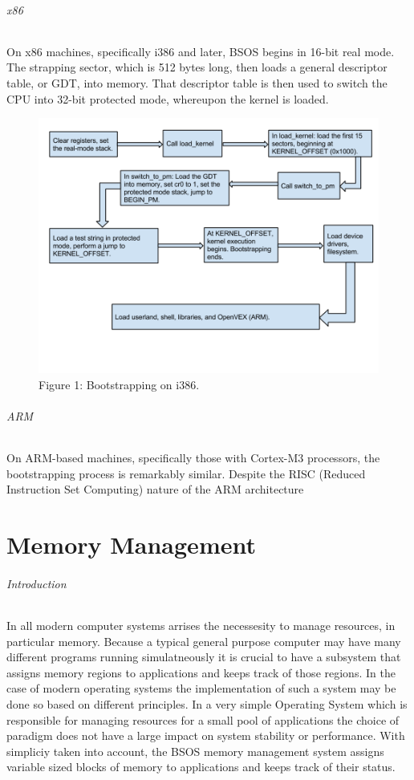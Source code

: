\documentclass[english]{article}
\begin{document}
\paragraph{x86}
On x86 machines, specifically i386 and later, BSOS begins in 16-bit real mode. The strapping sector, which is 512 bytes long, then loads a general descriptor table, or GDT, into memory. That descriptor table is then used to switch the CPU into 32-bit protected mode, whereupon the kernel is loaded.
\begin{figure}[h!]
\centerline{\includegraphics[scale=0.4]{imgs/boot_x86.png}}
\caption{Figure 1: Bootstrapping on i386.}
\end{figure}

\paragraph{ARM}
On ARM-based machines, specifically those with Cortex-M3 processors, the bootstrapping process is remarkably similar. Despite the RISC (Reduced Instruction Set Computing) nature of the ARM architecture


\part{Memory Management}

\paragraph{Introduction}
In all modern computer systems arrises the necessesity to manage resources, in particular memory. Because a typical general purpose computer
may have many different programs running simulatneously it is crucial to have a subsystem that assigns memory regions to applications and keeps
track of those regions. In the case of modern operating systems the implementation of such a system may be done so based on different principles.
In a very simple Operating System which is responsible for managing resources for a small pool of applications the choice of paradigm does not have a large impact on system stability or performance.
With simpliciy taken into account, the BSOS memory management system assigns variable sized blocks of memory to applications and keeps track of their status.
\end{document}
